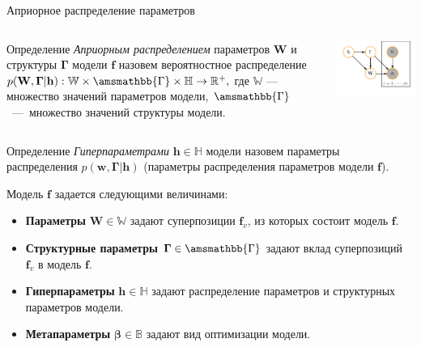 \documentclass[usenames,dvipsnames,11pt,pdf,utf8,russian,aspectratio=43]{beamer}
\begin{document}
\begin{frame}{Априорное распределение параметров}
\footnotesize   
\begin{columns}
\begin{column}{0.6\textwidth}
   \begin{block}{Определение}
\textit{Априорным распределением} параметров $\mathbf{W}$ и структуры  $\boldsymbol{\Gamma}$ модели $\mathbf{f}$ назовем вероятностное распределение
$
    p(\mathbf{W}, \boldsymbol{\Gamma}|\mathbf{h}): \mathbb{W} \times \amsmathbb{\Gamma} \times \mathbb{H} \to \mathbb{R}^{+}, 
$
где $\mathbb{W}$ --- множество значений параметров модели, $\amsmathbb{\Gamma}$~---~множество значений структуры модели.
\end{block}

\end{column}
\begin{column}{0.4\textwidth}  %
    \begin{center}
     \includegraphics[width=\textwidth]{simple_plate.pdf}
     \end{center}
\end{column}
\end{columns}
\vspace*{-0.5cm}
\begin{block}{Определение}
\textit{Гиперпараметрами} $\mathbf{h}\in \mathbb{H}$ модели  назовем параметры распределения $p(\mathbf{w}, \boldsymbol{\Gamma}|\mathbf{h})$ (параметры распределения параметров модели $\mathbf{f}$).
 
\end{block}
Модель $\mathbf{f}$ задается следующими величинами:
\begin{itemize}
\item \textbf{Параметры} $\mathbf{W} \in \mathbb{W}$ задают суперпозиции $\mathbf{f}_v$, из которых состоит модель $\mathbf{f}$.
\item \textbf{Структурные параметры} $\boldsymbol{\Gamma} \in \amsmathbb{\Gamma}$ задают вклад суперпозиций $\mathbf{f}_v$ в модель $\mathbf{f}$.
\item \textbf{Гиперпараметры} $\mathbf{h} \in \mathbb{H}$ задают распределение параметров и структурных параметров модели.
\item \textbf{Метапараметры} $\boldsymbol{\beta} \in \mathbb{B}$ задают вид оптимизации модели.
\end{itemize}


\end{frame}
\end{document}

